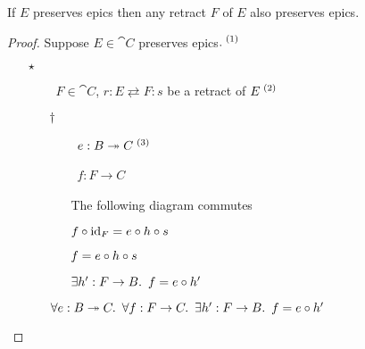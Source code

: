 \begin{prop}
  If $E$ preserves epics then any retract $F$ of $E$ also preserves epics.

  \begin{proof}
    Suppose $E\in\cat{C}$ preserves epics$.^{\text~(1)}$

    \begin{itemize}
      \item[$\star$]
        \begin{itemize}
          \item[\phs]
            \Let~$F \in \cat{C}$, $r : E \rightleftarrows F : s$ be a retract of $E^{\text~(2)}$
            \marginnote{\Hyp}

          \item[$\dagger$]
            \begin{itemize}
              \item[\phs]
                \Let~$e : B \twoheadrightarrow C^{\text~(3)}$
                \marginnote{\Hyp}

              \item[\phs]
                \Let~$f : F \to C$
                \marginnote{\Hyp}

              \item[\imps]
                The following diagram commutes
                \begin{center}
                \end{center}

              \item[\imps] $f\circ\operatorname{id}_F = e\circ h\circ s$

              \item[\imps] $f = e\circ h\circ s$
                \marginnote{\Def-$\id$}

              \item[\imps] $\exists h^\prime : F\to B\ldotp~f = e\circ h^\prime$
                \marginnote{$\exists$-\Intro}
            \end{itemize}
            \item[\imps]
              $\forall e : B \twoheadrightarrow C\ldotp~\forall f : F \to C\ldotp~\exists h^\prime : F\to B\ldotp~f = e\circ h^\prime$
              \marginnote{$\forall$-\Intro-$\dagger$}


\end{itemize}
\end{itemize}
\end{proof}
\end{prop}
